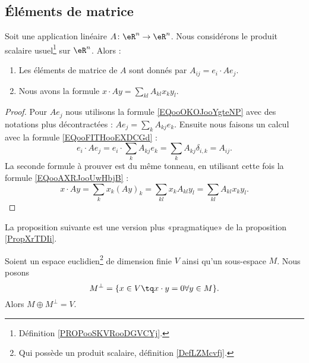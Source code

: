 \subsection{Éléments de matrice}

\begin{proposition}     \label{PROPooZKWXooWmEzoA}
	Soit une application linéaire \( A\colon \eR^n\to \eR^n\). Nous considérons le produit scalaire usuel\footnote{Définition \ref{PROPooSKVRooDGVCYj}.} sur \( \eR^n\). Alors :
	\begin{enumerate}
		\item
		      Les éléments de matrice de \( A\) sont donnés par \( A_{ij}=e_i\cdot Ae_j\).
		\item
		      Nous avons la formule \( x\cdot Ay=\sum_{kl}A_{kl}x_ky_l \).
	\end{enumerate}
\end{proposition}

\begin{proof}
	Pour \( Ae_j\) nous utilisons la formule \ref{EQooOKOJooYgteNP} avec des notations plus décontractées : \( Ae_j=\sum_kA_{kj}e_k\). Ensuite nous faisons un calcul avec la formule \eqref{EQooFITHooEXDCGd} :
	\begin{equation}
		e_i\cdot Ae_j=e_i\cdot \sum_kA_{kj}e_k=\sum_{k}A_{kj}\delta_{i,k}=A_{ij}.
	\end{equation}
	La seconde formule à prouver est du même tonneau, en utilisant cette fois la formule \eqref{EQooAXRJooUwHbjB} :
	\begin{equation}
		x\cdot Ay=\sum_kx_k(Ay)_k=\sum_{kl}x_kA_{kl}y_l=\sum_{kl}A_{kl}x_ky_l.
	\end{equation}
\end{proof}

La proposition suivante est une version plus «pragmatique» de la proposition \ref{PropXrTDIi}.
\begin{proposition}       \label{PROPooNITTooCYcrrT}
	Soient un espace euclidien\footnote{Qui possède un produit scalaire, définition \ref{DefLZMcvfj}.} de dimension finie \( V\) ainsi qu'un sous-espace \( M\). Nous posons
	\begin{equation}
		M^{\perp}=\{ x\in V\tq x\cdot y=0\forall y\in M \}.
	\end{equation}
	Alors \( M\oplus M^{\perp}=V\).
\end{proposition}

